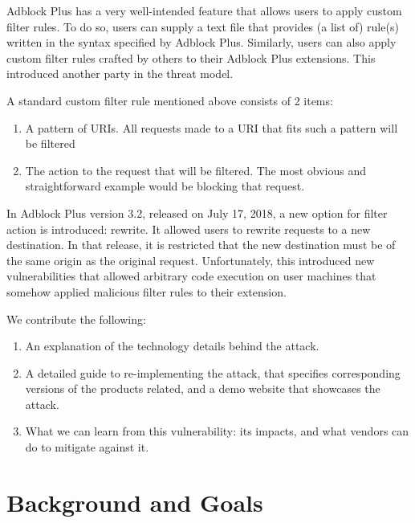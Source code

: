 \documentclass[conference]{IEEEtran}
\begin{document}
Adblock Plus has a very well-intended feature that allows users to apply custom filter rules. To do so, users can supply a text file that provides (a list of) rule(s) written in the syntax specified by Adblock Plus. Similarly, users can also apply custom filter rules crafted by others to their Adblock Plus extensions. This introduced another party in the threat model.

A standard custom filter rule mentioned above consists of 2 items:
\begin{enumerate}
    \item A pattern of URIs. All requests made to a URI that fits such a pattern will be filtered
    \item The action to the request that will be filtered. The most obvious and straightforward example would be blocking that request.
\end{enumerate}

In Adblock Plus version 3.2, released on July 17, 2018, a new option for filter action is introduced: rewrite. It allowed users to rewrite requests to a new destination. In that release, it is restricted that the new destination must be of the same origin as the original request. Unfortunately, this introduced new vulnerabilities that allowed arbitrary code execution on user machines that somehow applied malicious filter rules to their extension. \cite{abp_code_injection,abp_issue_6622,abp_rewrite_pr,abp_filter_guide}

We contribute the following:
\begin{enumerate}
    \item An explanation of the technology details behind the attack.
    \item A detailed guide to re-implementing the attack, that specifies corresponding versions of the products related, and a demo website that showcases the attack.
    \item What we can learn from this vulnerability: its impacts, and what vendors can do to mitigate against it.
\end{enumerate}

\section{Background and Goals}
\end{document}
